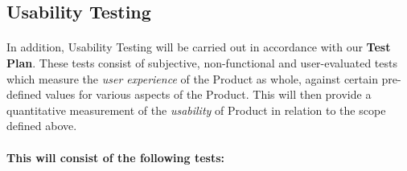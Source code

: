 \documentclass{article}
\begin{document}
\subsection{Usability Testing}
\paragraph{}In addition, Usability Testing will be carried out in accordance with our \textbf{Test Plan}. These tests consist of subjective, non-functional and user-evaluated tests which measure the \emph{user experience} of the Product as whole, against certain pre-defined values for various aspects of the Product. This will then provide a quantitative measurement of the \emph{usability} of Product in relation to the scope defined above.
\paragraph{}\textbf{This will consist of the following tests:}
\end{document}
